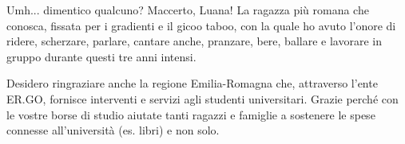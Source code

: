 Umh... dimentico qualcuno? Maccerto, Luana! La ragazza più romana che conosca, fissata per i gradienti e il gicoo taboo, con la quale ho avuto l'onore di ridere, scherzare, parlare, cantare anche, pranzare, bere, ballare e lavorare in gruppo durante questi tre anni intensi.
\vspace{20pt}

Desidero ringraziare anche la regione Emilia-Romagna che, attraverso l'ente ER.GO, fornisce interventi e servizi agli studenti universitari. Grazie perché con le vostre borse di studio aiutate tanti ragazzi e famiglie a sostenere le spese connesse all’università (es. libri) e non solo.